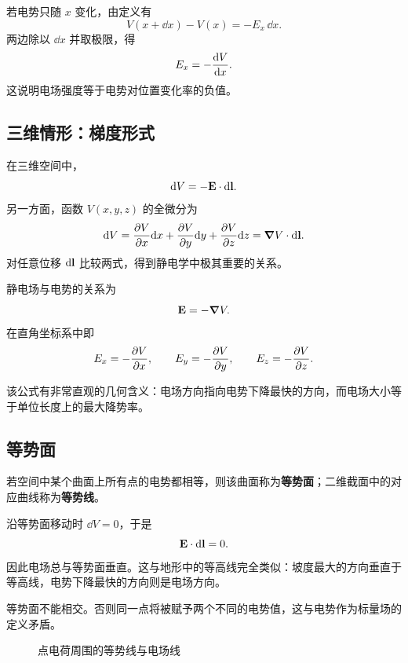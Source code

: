 若电势只随 $x$ 变化，由定义有
\[
V(x+\dd x)-V(x)=-E_x\,\dd x.
\]
两边除以 $\dd x$ 并取极限，得
\[
E_x=-\dv{V}{x}.
\]
这说明电场强度等于电势对位置变化率的负值。

\subsection{三维情形：梯度形式}

在三维空间中，
\[
\dd V=-\vb E\cdot \dd\vb l.
\]
另一方面，函数 $V(x,y,z)$ 的全微分为
\[
\dd V=\frac{\partial V}{\partial x}\dd x+\frac{\partial V}{\partial y}\dd y+\frac{\partial V}{\partial z}\dd z=\grad V\cdot \dd\vb l.
\]
对任意位移 $\dd\vb l$ 比较两式，得到静电学中极其重要的关系。

\begin{law}
静电场与电势的关系为
\[
\vb E=-\grad V.
\]
在直角坐标系中即
\[
E_x=-\pdv{V}{x},\qquad E_y=-\pdv{V}{y},\qquad E_z=-\pdv{V}{z}.
\]
\end{law}

该公式有非常直观的几何含义：电场方向指向电势下降最快的方向，而电场大小等于单位长度上的最大降势率。

\subsection{等势面}

\begin{definition}
若空间中某个曲面上所有点的电势都相等，则该曲面称为\textbf{等势面}；二维截面中的对应曲线称为\textbf{等势线}。
\end{definition}

沿等势面移动时 $\dd V=0$，于是
\[
\vb E\cdot \dd\vb l=0.
\]
因此电场总与等势面垂直。这与地形中的等高线完全类似：坡度最大的方向垂直于等高线，电势下降最快的方向则是电场方向。

\begin{remark}
等势面不能相交。否则同一点将被赋予两个不同的电势值，这与电势作为标量场的定义矛盾。
\end{remark}

\begin{figure}[H]
\centering
{}
\caption{点电荷周围的等势线与电场线}
\end{figure}

